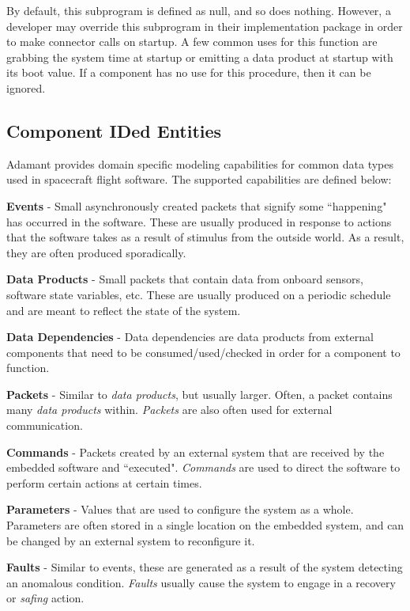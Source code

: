 By default, this subprogram is defined as null, and so does nothing. However, a developer may override this subprogram in their implementation package in order to make connector calls on startup. A few common uses for this function are grabbing the system time at startup or emitting a data product at startup with its boot value. If a component has no use for this procedure, then it can be ignored.

\subsection{Component IDed Entities} \label{Component IDed Entities}

Adamant provides domain specific modeling capabilities for common data types used in spacecraft flight software. The supported capabilities are defined below:

\vspace{5mm} %
\begin{spaceditemize}
  \item \textbf{Events} - Small asynchronously created packets that signify some ``happening" has occurred in the software. These are usually produced in response to actions that the software takes as a result of stimulus from the outside world. As a result, they are often produced sporadically.
  \item \textbf{Data Products} - Small packets that contain data from onboard sensors, software state variables, etc. These are usually produced on a periodic schedule and are meant to reflect the state of the system.
  \item \textbf{Data Dependencies} - Data dependencies are data products from external components that need to be consumed/used/checked in order for a component to function.
  \item \textbf{Packets} - Similar to \textit{data products}, but usually larger. Often, a packet contains many \textit{data products} within. \textit{Packets} are also often used for external communication.
  \item \textbf{Commands} - Packets created by an external system that are received by the embedded software and ``executed". \textit{Commands} are used to direct the software to perform certain actions at certain times.
  \item \textbf{Parameters} - Values that are used to configure the system as a whole. Parameters are often stored in a single location on the embedded system, and can be changed by an external system to reconfigure it.
  \item \textbf{Faults} - Similar to events, these are generated as a result of the system detecting an anomalous condition. \textit{Faults} usually cause the system to engage in a recovery or \textit{safing} action.
\end{spaceditemize}
\vspace{5mm} %

